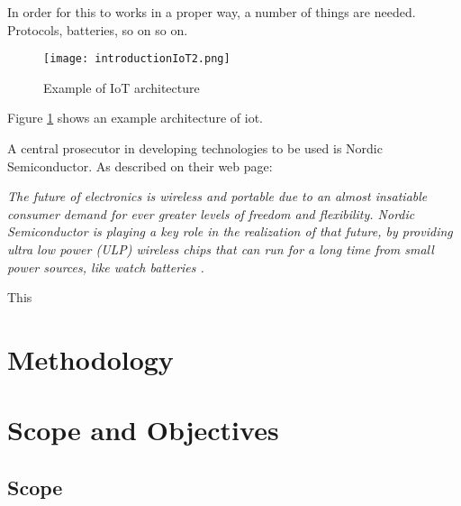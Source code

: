 In order for this to works in a proper way, a number of things are needed. Protocols, batteries, so on so on. 


\begin{figure}[ht]
    \centering
    \texttt{[image: introductionIoT2.png]}    
    \caption{Example of IoT architecture}
    \label{iotExampleArchitecture}
\end{figure}

Figure \ref{iotExampleArchitecture} shows an example architecture of \gls{iot}. 




A central prosecutor in developing technologies to be used is Nordic Semiconductor. As described on their web page: 

\begin{displayquote}
\textit{The future of electronics is wireless and portable due to an almost insatiable consumer demand for ever greater levels of freedom and flexibility. Nordic Semiconductor is playing a key role in the realization of that future, by providing ultra low power (ULP) wireless chips that can run for a long time from small power sources, like watch batteries \cite{aboutNordic}.}
\end{displayquote}

This 

\section{Methodology}




\section{Scope and Objectives}

\subsection{Scope}

